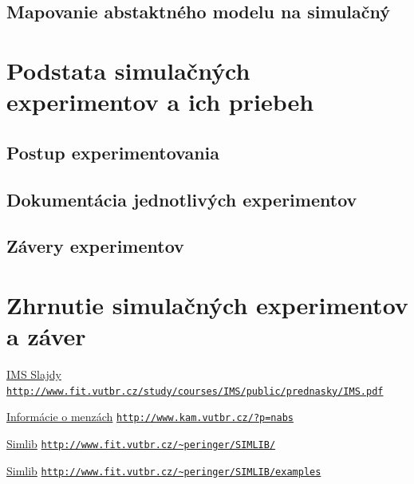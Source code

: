 \documentclass{article}
\begin{document}
\subsection{Mapovanie abstaktného modelu na simulačný}

\section{Podstata simulačných experimentov a ich priebeh}
\subsection{Postup experimentovania}
\subsection{Dokumentácia jednotlivých experimentov}
\subsection{Závery experimentov}

\section{Zhrnutie simulačných experimentov a záver}

  \begin{thebibliography}{1}

  \href{http://www.fit.vutbr.cz/study/courses/IMS/public/prednasky/IMS.pdf}{IMS Slajdy} \newline
  \href{http://www.fit.vutbr.cz/study/courses/IMS/public/prednasky/IMS.pdf}{\nolinkurl{http://www.fit.vutbr.cz/study/courses/IMS/public/prednasky/IMS.pdf}}
  
  \href{http://www.kam.vutbr.cz/?p=nabs}{Informácie o menzách} \newline
  \href{http://www.kam.vutbr.cz/?p=nabs}{\nolinkurl{http://www.kam.vutbr.cz/?p=nabs}}
  
  \href{http://www.fit.vutbr.cz/~peringer/SIMLIB/}{Simlib} \newline
  \href{http://www.fit.vutbr.cz/~peringer/SIMLIB/}{\nolinkurl{http://www.fit.vutbr.cz/~peringer/SIMLIB/}}
  
  \href{http://www.fit.vutbr.cz/~peringer/SIMLIB/examples/}{Simlib} \newline
  \href{http://www.fit.vutbr.cz/~peringer/SIMLIB/examples/}{\nolinkurl{http://www.fit.vutbr.cz/~peringer/SIMLIB/examples}}

  \end{thebibliography}
\end{document}
